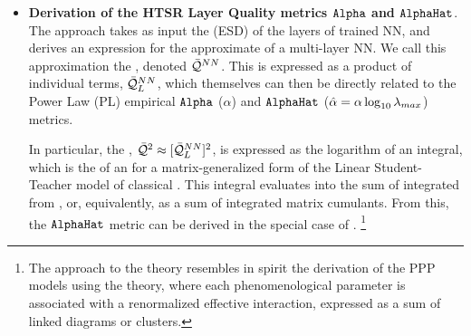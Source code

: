 \begin{itemize}
\item
  \textbf{Derivation of the HTSR Layer Quality metrics $\texttt{Alpha}$ and  $\texttt{AlphaHat}$}.
  The \SETOL approach takes as input the
  \EmpiricalSpectralDensity (ESD) of the layers
  of trained NN, and  derives an expression for the approximate \emph{\AverageGeneralizationAccuracy}
  of a multi-layer NN. We call this approximation the \emph{\ModelQuality}, denoted $\bar{\mathcal{Q}}^{NN}$.
  This \ModelQuality is expressed as a product of individual \LayerQuality terms, $\bar{\mathcal{Q}}^{NN}_{L}$,
  which themselves can then 
  be directly related to the \HTSR Power Law (PL) empirical $\texttt{Alpha}$ ($\alpha$)
  and $\texttt{AlphaHat}$  ($\hat\alpha=\alpha\log_{10}\lambda_{max}$) metrics.

  In particular, the \LayerQualitySquared, $\bar{\mathcal{Q}}^{2}\approx[\bar{\mathcal{Q}}^{NN}_{L}]^{2}$, is
  expressed as the logarithm of an \HCIZtext integral, which is the \ThermalAverage of an \EffectivePotential
  for a matrix-generalized form of the Linear Student-Teacher model of classical \STATMECH. This \HCIZtext
  integral evaluates into the sum of integrated \RTransforms
  from \RMT, or, equivalently, as a sum of integrated matrix cumulants.
  From this, the \HTSR $\texttt{AlphaHat}$ metric can be derived in the special case of \IdealLearning.
  \footnote{The \SETOL approach to the \HTSR theory resembles
  in spirit the derivation of the \SemiEmpirical PPP models using
  the \EffectiveHamiltonian theory, where each phenomenological parameter is associated with a renormalized
  effective interaction, expressed as a sum of linked diagrams or clusters.\cite{Martin1996, Martin1998}}


\end{itemize}
